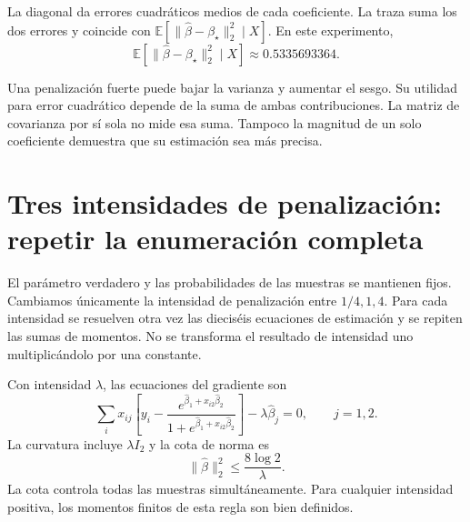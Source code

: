 \documentclass[11pt,a4paper]{article}
\newcommand{\E}{\mathbb E}
\begin{document}
La diagonal da errores cuadráticos medios de cada coeficiente.
La traza suma los dos errores y coincide con
\(\E[\|\widehat\beta-\beta_\star\|_2^2\mid X]\).
En este experimento,
\[
\E[\|\widehat\beta-\beta_\star\|_2^2\mid X]\approx0.5335693364.
\]

Una penalización fuerte puede bajar la varianza y aumentar
el sesgo. Su utilidad para error cuadrático depende de la
suma de ambas contribuciones.
La matriz de covarianza por sí sola no mide esa suma.
Tampoco la magnitud de un solo coeficiente demuestra
que su estimación sea más precisa.

\clearpage
\section{Tres intensidades de penalización: repetir la enumeración completa}\label{logit145}
El parámetro verdadero y las probabilidades de las muestras
se mantienen fijos. Cambiamos únicamente la intensidad
de penalización entre \(1/4,1,4\).
Para cada intensidad se resuelven otra vez las dieciséis
ecuaciones de estimación y se repiten las sumas de momentos.
No se transforma el resultado de intensidad uno
multiplicándolo por una constante.

Con intensidad \(\lambda\), las ecuaciones del gradiente son
\[
\sum_i x_{ij}\left[y_i-
\frac{e^{\widehat\beta_1+x_{i2}\widehat\beta_2}}
{1+e^{\widehat\beta_1+x_{i2}\widehat\beta_2}}\right]
-\lambda\widehat\beta_j=0,\qquad j=1,2.
\]
La curvatura incluye \(\lambda I_2\) y la cota de norma es
\[
\|\widehat\beta\|_2^2\le\frac{8\log2}{\lambda}.
\]
La cota controla todas las muestras simultáneamente.
Para cualquier intensidad positiva, los momentos finitos
de esta regla son bien definidos.
\end{document}
